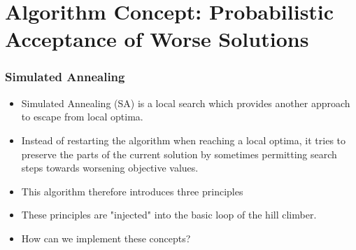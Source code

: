 \documentclass[mathserif]{beamer}%
\begin{document}
\section{Algorithm Concept: Probabilistic Acceptance of Worse Solutions}%
%
\begin{frame}%
\frametitle{Simulated Annealing}%
\begin{itemize}%
\item Simulated Annealing (SA)\cite{KGV1983OBSA,C1985TATTTSPAESA,DPSW1982MCTICO,P1970AMCMFTASOCTOCOP} is a local search which provides another approach to escape from local optima\cite{WGOEB,S2003ITSSAO}.%
\item<2-> Instead of restarting the algorithm when reaching a local optima, it tries to preserve the parts of the current solution by sometimes permitting search steps towards worsening objective values.%
\item<3-> This algorithm therefore introduces three principles%
\item<7-> These principles are "injected" into the basic loop of the hill climber.%
\item<8-> How can we implement these concepts?%
\end{itemize}%
\end{frame}%
%
%
\setcounter{eqLast}{\value{equation}}%
%
\setcounter{eqDeltaE}{\value{equation}}%
%
\end{document}

